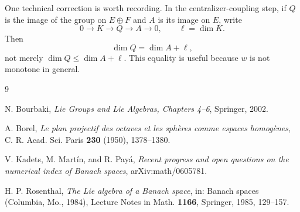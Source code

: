 \documentclass[11pt]{article}
\theoremstyle{remark}
\begin{document}
One technical correction is worth recording.  In the centralizer-coupling step, if \(Q\) is the image of the group on \(E\oplus F\) and \(A\) is its image on \(E\), write
\[
  0\longrightarrow K\longrightarrow Q\longrightarrow A\longrightarrow 0,
  \qquad
  \ell=\dim K.
\]
Then
\[
  \dim Q=\dim A+\ell,
\]
not merely \(\dim Q\leq \dim A+\ell\).  This equality is useful because \(w\) is not monotone in general.

\begin{thebibliography}{9}

N. Bourbaki,
\emph{Lie Groups and Lie Algebras, Chapters 4--6},
Springer, 2002.

A. Borel,
\emph{Le plan projectif des octaves et les sph\`eres comme espaces homog\`enes},
C. R. Acad. Sci. Paris \textbf{230} (1950), 1378--1380.

V. Kadets, M. Mart\'in, and R. Pay\'a,
\emph{Recent progress and open questions on the numerical index of Banach spaces},
arXiv:math/0605781.

H. P. Rosenthal,
\emph{The Lie algebra of a Banach space},
in: Banach spaces (Columbia, Mo., 1984), Lecture Notes in Math. \textbf{1166}, Springer, 1985, 129--157.

\end{thebibliography}
\end{document}
